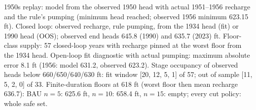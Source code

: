 \begin{table}[H]
\centering
\caption{Edwards: replays, closed-loop end heads and floor-class supply.}
\label{tab:si-edw-replays}
\small
{}
\par\smallskip\begin{minipage}{0.97\linewidth}\footnotesize 1950s replay: model from the observed 1950 head with actual 1951--1956 recharge and the rule's pumping (minimum head reached; observed 1956 minimum 623.15 ft). Closed loop: observed recharge, rule pumping, from the 1934 head (fit) or 1990 head (OOS); observed end heads 645.8 (1990) and 635.7 (2023) ft. Floor-class supply: 57 closed-loop years with recharge pinned at the worst floor from the 1934 head. Open-loop fit diagnostic with actual pumping: maximum absolute error 8.1 ft (1956: model 631.2, observed 623.2). Stage occupancy of observed heads below 660/650/640/630 ft: fit window [20, 12, 5, 1] of 57; out of sample [11, 5, 2, 0] of 33. Finite-duration floors at 618 ft (worst floor then mean recharge 636.7): BAU $n=5$: 625.6 ft, $n=10$: 658.4 ft, $n=15$: empty; every cut policy: whole safe set.\end{minipage}
\end{table}
